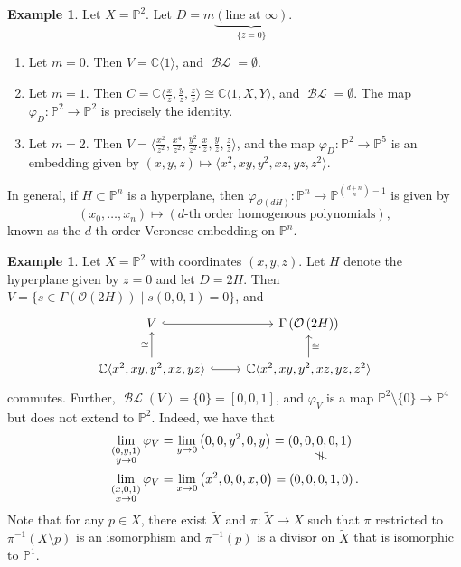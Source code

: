 \documentclass[10pt,letterpaper,cm]{nupset}
\theoremstyle{definition}
\newtheorem{exmp}[defn]{Example}
\theoremstyle{theorem}
\theoremstyle{remark}
\newcommand{\C}{\mathbb C}
\renewcommand{\O}{\mathcal O}
\renewcommand{\P}{\mathbb P}
\newcommand{\1}{\mathbb{1}}
\newcommand{\0}{\vec 0}
\DeclareMathOperator{\BL}{\mathcal{BL}}
\newcommand{\vertneq}{\rotatebox{90}{$\,\neq$}}
\newcommand{\net}[2]{\underset{\scriptstyle\overset{\mkern4mu\vertneq}{#2}}{#1}}
\newcommand{\be}{\begin{enumerate}}
\newcommand{\ee}{\end{enumerate}}
\begin{document}
\begin{exmp} Let $X = \P^2$. Let $D= m\underbrace{\left(\text{line at }\infty\right)}_{\{z=0\}}$.
\be
\item Let $m=0$. Then $V = \C\langle 1\rangle$, and $\BL= \emptyset$.
\item Let $m=1$. Then $C = \C\langle \frac{x}{z}, \frac{y}{z}, \frac{z}{z}\rangle \cong \C\langle 1, X, Y\rangle$, and $\BL = \emptyset$. The map $\varphi_D : \P^2 \to \P^2$ is precisely the identity. 
\item Let $m=2$. Then $V = \langle \frac{x^2}{z^2}, \frac{x^4}{z^2}, \frac{y^2}{z^2}. \frac{x}{z}, \frac{y}{z}, \frac{z}{z}\rangle$, and the map $\varphi_D : \P^2 \to \P^5$ is an embedding given by $(x,y,z) \mapsto \langle x^2, xy, y^2, xz, yz, z^2\rangle$.
\ee
\end{exmp}

In general, if $H\subset \P^n$ is a hyperplane, then $\varphi_{\O\left(d{H}\right)} : \P^n \to \P^{{{d+n}\choose n} -1}$ is given by $$\left(x_0, \ldots, x_n\right) \mapsto \left(d\text{-th order homogenous polynomials}\right),$$  known as the $d$-th order Veronese embedding on $\P^n$.

\begin{exmp}
Let $X = \P^2$ with coordinates $\left(x,y,z\right)$. Let $H$ denote the hyperplane given by $z=0$ and let $D = 2{H}$. Then $ V= \{s\in \Gamma  \left(\O\left(2{H}\right)\right) \mid s\left(0,0,1\right) =0\}$, and
\[
\begin{tikzcd}
V \arrow[r, hook]                                                         & \Gamma\left(\O\left(2{H}\right)\right)                           \\
{\C\langle x^2, xy, y^2, xz,yz\rangle} \arrow[r, hook] \arrow[u, "\cong"] & {\C\langle x^2, xy, y^2, xz, yz, z^2\rangle} \arrow[u, "\cong"']
\end{tikzcd}
\] commutes. Further, $\BL(V) = \{0\} = \left[0,0,1\right]$, and $\varphi_V$ is a map $\P^2 \setminus \{0\} \to \P^4$ but does not extend to $\P^2$. Indeed, we have that
\begin{align*}
\lim_{\substack{\left(0, y, 1\right) \\ y\to 0}} \varphi_V  & = \lim_{y\to0}\left(0,0,y^2,0, y\right)= \net{\left(0,0,0,0,1\right)}{}
\\ \lim_{\substack{\left(x, 0, 1\right) \\ x\to 0}} \varphi_V  & = \lim_{x\to0}\left(x^2,0,0,x, 0\right)= \left(0,0,0,1,0\right).
\end{align*} Note that for any $p\in X$, there exist $\widetilde{X}$ and $\pi : \widetilde{X}\to X$ such that $\pi$ restricted to $\pi^{-1}\left(X\setminus p\right)$ is an isomorphism and $\pi^{-1}(p)$ is a divisor on $\widetilde{X}$ that is isomorphic to $\P^1$.
\end{exmp}
\end{document}
